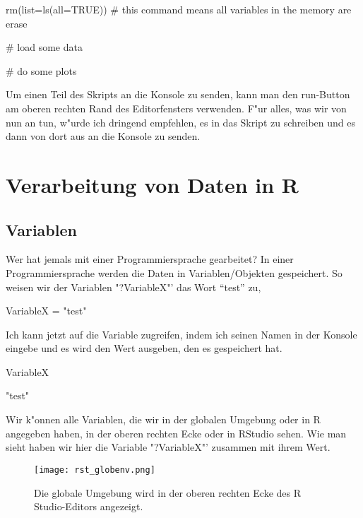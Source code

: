 \documentclass[a4paper,twoside]{tufte-book}\usepackage[]{graphicx}\usepackage[]{color}
\begin{document}
\begin{appendices}
\begin{Schunk}
\begin{Sinput}
rm(list=ls(all=TRUE))  # this command means all variables in the memory are erase

# load some data

# do some plots
\end{Sinput}
\end{Schunk}

Um einen Teil des Skripts an die Konsole zu senden, kann man den run-Button am oberen rechten Rand des Editorfensters verwenden. F"ur alles, was wir von nun an tun, w"urde ich dringend empfehlen, es in das Skript zu schreiben und es dann von dort aus an die Konsole zu senden.

\chapter{Verarbeitung von Daten in R}
\label{HandlingDataInR}

\section{Variablen}

Wer hat jemals mit einer Programmiersprache gearbeitet? In einer Programmiersprache werden die Daten in Variablen/Objekten gespeichert. So weisen wir der Variablen "?VariableX"' das Wort "`test"' zu,

\begin{Schunk}
\begin{Sinput}
VariableX = "test"
\end{Sinput}
\end{Schunk}

Ich kann jetzt auf die Variable zugreifen, indem ich seinen Namen in der Konsole eingebe und es wird den Wert ausgeben, den es gespeichert hat.
\begin{Schunk}
\begin{Sinput}
VariableX
\end{Sinput}
\begin{Soutput}
[1] "test"
\end{Soutput}
\end{Schunk}

Wir k"onnen alle Variablen, die wir in der globalen Umgebung oder in R angegeben haben, in der oberen rechten Ecke oder in RStudio sehen. Wie man sieht haben wir hier die Variable "?VariableX"' zusammen mit ihrem Wert.


\begin{figure}[]
\begin{center}
\texttt{[image: rst\_globenv.png]}
\caption{Die globale Umgebung wird in der oberen rechten Ecke des R Studio-Editors angezeigt.}
\label{fig: Rstudio}
\end{center}
\end{figure}


\end{appendices}
\end{document}
